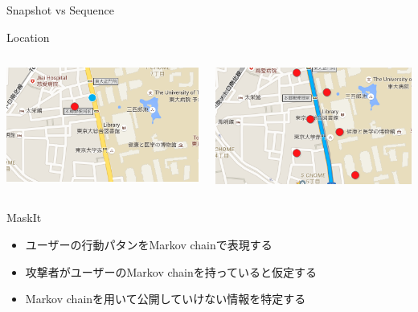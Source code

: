 \documentclass[14pt,xcolor=dvipsnames,table,dvipdfmx]{beamer}
\begin{document}
\begin{frame}{Snapshot vs Sequence}
	\begin{block}{Location}
	    \begin{columns}[t]
			\begin{column}{0.4\textwidth} %
				\includegraphics[width=\columnwidth]{photo16.png}
			\end{column}
			\begin{column}{0.4\textwidth} %
				\includegraphics[width=\columnwidth]{photo16-1.png}
			\end{column}
		\end{columns}
		\begin{block}{MaskIt \cite{gotz_maskit:_2012}}
			\begin{itemize}
				\item ユーザーの行動パタンをMarkov chainで表現する
				\item 攻撃者がユーザーのMarkov chainを持っていると仮定する
				\item Markov chainを用いて公開していけない情報を特定する
			\end{itemize}
		\end{block}
	\end{block}
\end{frame}
\end{document}
